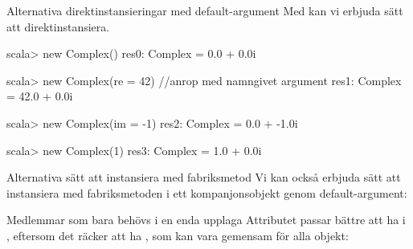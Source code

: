 \begin{Slide}{Alternativa direktinstansieringar med default-argument}\SlideFontSmall
Med  kan vi erbjuda  sätt att direktinstansiera.
\begin{REPL}
scala> new Complex()
res0: Complex = 0.0 + 0.0i

scala> new Complex(re = 42)  //anrop med namngivet argument
res1: Complex = 42.0 + 0.0i

scala> new Complex(im = -1)
res2: Complex = 0.0 + -1.0i

scala> new Complex(1)
res3: Complex = 1.0 + 0.0i
\end{REPL}
\end{Slide} 

\begin{Slide}{Alternativa sätt att instansiera med fabriksmetod}
Vi kan också erbjuda  sätt att instansiera  med fabriksmetoden  i ett kompanjonsobjekt genom default-argument:

\end{Slide}

\begin{Slide}{Medlemmar som bara behövs i en enda upplaga}
Attributet  passar bättre att ha i , eftersom det räcker att ha , som kan vara gemensam för alla objekt:

\end{Slide}



